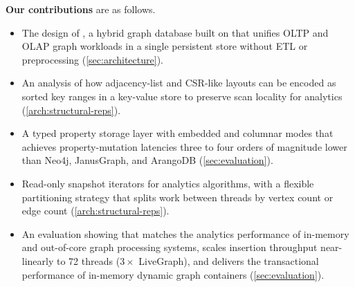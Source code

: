 \textbf{Our contributions} are as follows.
\begin{itemize}
  \item The design of \project{}, a hybrid graph database built on \wt{} that unifies OLTP and OLAP graph workloads in a single persistent store without ETL or preprocessing (\autoref{sec:architecture}).
  \item An analysis of how adjacency-list and CSR-like layouts can be encoded as sorted key ranges in a key-value store to preserve scan locality for analytics (\autoref{arch:structural-reps}).
  \item A typed property storage layer with embedded and columnar modes that achieves property-mutation latencies three to four orders of magnitude lower than Neo4j, JanusGraph, and ArangoDB (\autoref{sec:evaluation}).
  \item Read-only snapshot iterators for analytics algorithms, with a flexible partitioning strategy that splits work between threads by vertex count or edge count (\autoref{arch:structural-reps}).
  \item An evaluation showing that \project{} matches the analytics performance of in-memory and out-of-core graph processing systems, scales insertion throughput near-linearly to 72 threads ($3\times$ LiveGraph), and delivers the transactional performance of in-memory dynamic graph containers (\autoref{sec:evaluation}).
\end{itemize}
